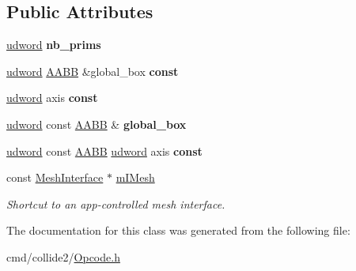 \subsection*{Public Attributes}
\begin{DoxyCompactItemize}
\item 
\hyperlink{IceTypes_8h_a44c6f1920ba5551225fb534f9d1a1733}{udword} {\bfseries nb\+\_\+prims}\hypertarget{classOpcode_1_1AABBTreeOfTrianglesBuilder_aa815faf1fa45cdbbf6aebdca768f122c}{}\label{classOpcode_1_1AABBTreeOfTrianglesBuilder_aa815faf1fa45cdbbf6aebdca768f122c}

\item 
\hyperlink{IceTypes_8h_a44c6f1920ba5551225fb534f9d1a1733}{udword} \hyperlink{classOpcode_1_1AABB}{A\+A\+BB} \&global\+\_\+box {\bfseries const}\hypertarget{classOpcode_1_1AABBTreeOfTrianglesBuilder_a7cd49baed2ed4678db6b43785803e4e2}{}\label{classOpcode_1_1AABBTreeOfTrianglesBuilder_a7cd49baed2ed4678db6b43785803e4e2}

\item 
\hyperlink{IceTypes_8h_a44c6f1920ba5551225fb534f9d1a1733}{udword} axis {\bfseries const}\hypertarget{classOpcode_1_1AABBTreeOfTrianglesBuilder_abad7a863a41eebd9899a74df4d4fe778}{}\label{classOpcode_1_1AABBTreeOfTrianglesBuilder_abad7a863a41eebd9899a74df4d4fe778}

\item 
\hyperlink{IceTypes_8h_a44c6f1920ba5551225fb534f9d1a1733}{udword} const \hyperlink{classOpcode_1_1AABB}{A\+A\+BB} \& {\bfseries global\+\_\+box}\hypertarget{classOpcode_1_1AABBTreeOfTrianglesBuilder_abe69e468804469e75b63251f85fe498c}{}\label{classOpcode_1_1AABBTreeOfTrianglesBuilder_abe69e468804469e75b63251f85fe498c}

\item 
\hyperlink{IceTypes_8h_a44c6f1920ba5551225fb534f9d1a1733}{udword} const \hyperlink{classOpcode_1_1AABB}{A\+A\+BB} \hyperlink{IceTypes_8h_a44c6f1920ba5551225fb534f9d1a1733}{udword} axis {\bfseries const}\hypertarget{classOpcode_1_1AABBTreeOfTrianglesBuilder_a94addcf3463cea264471151d9c8c8c27}{}\label{classOpcode_1_1AABBTreeOfTrianglesBuilder_a94addcf3463cea264471151d9c8c8c27}

\item 
const \hyperlink{classOpcode_1_1MeshInterface}{Mesh\+Interface} $\ast$ \hyperlink{classOpcode_1_1AABBTreeOfTrianglesBuilder_a5dc7de9a366e72c2b54c3f2b7d113cc4}{m\+I\+Mesh}\hypertarget{classOpcode_1_1AABBTreeOfTrianglesBuilder_a5dc7de9a366e72c2b54c3f2b7d113cc4}{}\label{classOpcode_1_1AABBTreeOfTrianglesBuilder_a5dc7de9a366e72c2b54c3f2b7d113cc4}

\begin{DoxyCompactList}\small\item\em Shortcut to an app-\/controlled mesh interface. \end{DoxyCompactList}\end{DoxyCompactItemize}


The documentation for this class was generated from the following file\+:\begin{DoxyCompactItemize}
\item 
cmd/collide2/\hyperlink{Opcode_8h}{Opcode.\+h}\end{DoxyCompactItemize}
